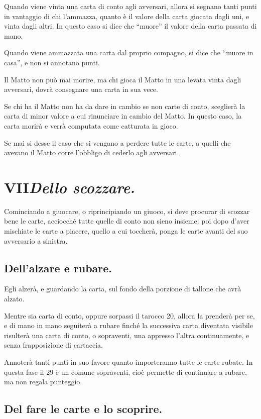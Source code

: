 \documentclass[11pt,a6paper]{article}
\begin{document}
Quando viene vinta una carta di conto agli avversari, allora si segnano tanti
punti in vantaggio di chi l'ammazza, quanto è il valore della carta giocata
dagli uni, e vinta dagli altri.  In questo caso si dice che ``muore'' il
valore della carta passata di mano.

Quando viene ammazzata una carta dal proprio compagno, si dice che ``muore
in casa'', e non si annotano punti.

Il Matto non può mai morire, ma chi gioca il Matto in una levata vinta dagli
avversari, dovrà consegnare una carta in sua vece.

Se chi ha il Matto non ha da dare in cambio se non carte di conto, sceglierà
la carta di minor valore a cui rinunciare in cambio del Matto.  In questo
caso, la carta morirà e verrà computata come catturata in gioco.

Se mai si desse il caso che si vengano a perdere tutte le carte, a quelli
che avevano il Matto corre l'obbligo di cederlo agli avversari.

\section{VII\hfill{\large\mdseries\slshape Dello scozzare.}}

Cominciando a giuocare, o riprincipiando un giuoco, si deve procurar di
scozzar bene le carte, acciocché tutte quelle di conto non sieno insieme:
poi dopo d'aver mischiate le carte a piacere, quello a cui toccherà, ponga
le carte avanti del suo avversario a sinistra.

\subsection{Dell'alzare e rubare.}

Egli alzerà, e guardando la
carta, sul fondo della porzione di tallone che avrà alzato.

Mentre sia carta di conto, oppure sorpassi il tarocco 20, allora la prenderà
per se, e di mano in mano seguiterà a rubare finché la successiva carta
diventata visibile risulterà una carta di conto, o sopraventi, una appresso
l'altra continuamente, e senza frapposizione di cartaccia.

Annoterà tanti punti in suo favore quanto importeranno tutte le carte
rubate.  In questa fase il 29 è un comune sopraventi, cioè permette di
continuare a rubare, ma non regala punteggio.

\subsection{Del fare le carte e lo scoprire.}
\end{document}
